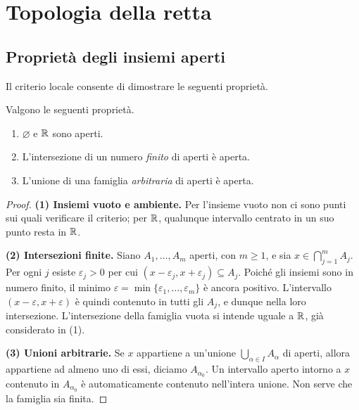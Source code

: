 \chapter{Topologia della retta}
\label{cap:topologia}



\section{Proprietà degli insiemi aperti}

Il criterio locale consente di dimostrare le seguenti proprietà.

\begin{proposizione}
Valgono le seguenti proprietà.
\begin{enumerate}[label=\arabic*.]
  \item $\varnothing$ e $\mathbb{R}$ sono aperti.
  \item L'intersezione di un numero \emph{finito} di aperti è aperta.
  \item L'unione di una famiglia \emph{arbitraria} di aperti è aperta.
\end{enumerate}
\end{proposizione}

\begin{proof}
\textbf{(1) Insiemi vuoto e ambiente.} Per l'insieme vuoto non ci sono punti sui quali verificare il criterio; per $\mathbb{R}$, qualunque intervallo centrato in un suo punto resta in $\mathbb{R}$.

\textbf{(2) Intersezioni finite.} Siano $A_1,\ldots,A_m$ aperti, con $m\ge1$, e sia $x\in\bigcap_{j=1}^{m}A_j$. Per ogni $j$ esiste $\varepsilon_j>0$ per cui $(x-\varepsilon_j,x+\varepsilon_j)\subseteq A_j$. Poiché gli insiemi sono in numero finito, il minimo $\varepsilon=\min\{\varepsilon_1,\ldots,\varepsilon_m\}$ è ancora positivo. L'intervallo $(x-\varepsilon,x+\varepsilon)$ è quindi contenuto in tutti gli $A_j$, e dunque nella loro intersezione. L'intersezione della famiglia vuota si intende uguale a $\mathbb{R}$, già considerato in (1).

\textbf{(3) Unioni arbitrarie.} Se $x$ appartiene a un'unione $\bigcup_{\alpha\in I}A_\alpha$ di aperti, allora appartiene ad almeno uno di essi, diciamo $A_{\alpha_0}$. Un intervallo aperto intorno a $x$ contenuto in $A_{\alpha_0}$ è automaticamente contenuto nell'intera unione. Non serve che la famiglia sia finita.
\end{proof}

